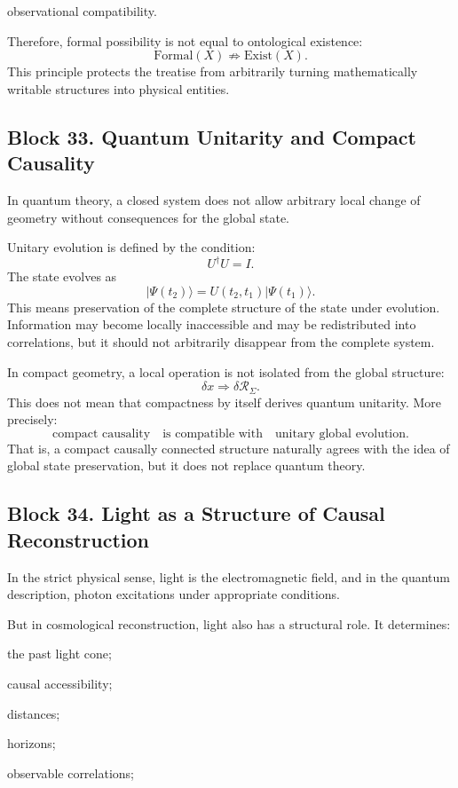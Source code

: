 \documentclass[12pt,a4paper]{article}
\theoremstyle{definition}
\begin{document}
observational compatibility.

Therefore, formal possibility is not equal to ontological existence:
\[
\mathrm{Formal}(X)
\not\Rightarrow
\mathrm{Exist}(X).
\]
This principle protects the treatise from arbitrarily turning mathematically writable structures into physical entities.



\subsection{Block 33. Quantum Unitarity and Compact Causality}
In quantum theory, a closed system does not allow arbitrary local change of geometry without consequences for the global state.

Unitary evolution is defined by the condition:
\[
U^\dagger U=I.
\]
The state evolves as
\[
|\Psi(t_2)\rangle
=
U(t_2,t_1)|\Psi(t_1)\rangle.
\]
This means preservation of the complete structure of the state under evolution. Information may become locally inaccessible and may be redistributed into correlations, but it should not arbitrarily disappear from the complete system.

In compact geometry, a local operation is not isolated from the global structure:
\[
\delta x\Rightarrow \delta\mathcal R_\Sigma.
\]
This does not mean that compactness by itself derives quantum unitarity. More precisely:
\[
\text{compact causality}
\quad
\text{is compatible with}
\quad
\text{unitary global evolution}.
\]
That is, a compact causally connected structure naturally agrees with the idea of global state preservation, but it does not replace quantum theory.



\subsection{Block 34. Light as a Structure of Causal Reconstruction}
In the strict physical sense, light is the electromagnetic field, and in the quantum description, photon excitations under appropriate conditions.

But in cosmological reconstruction, light also has a structural role. It determines:

the past light cone;

causal accessibility;

distances;

horizons;

observable correlations;
\end{document}
